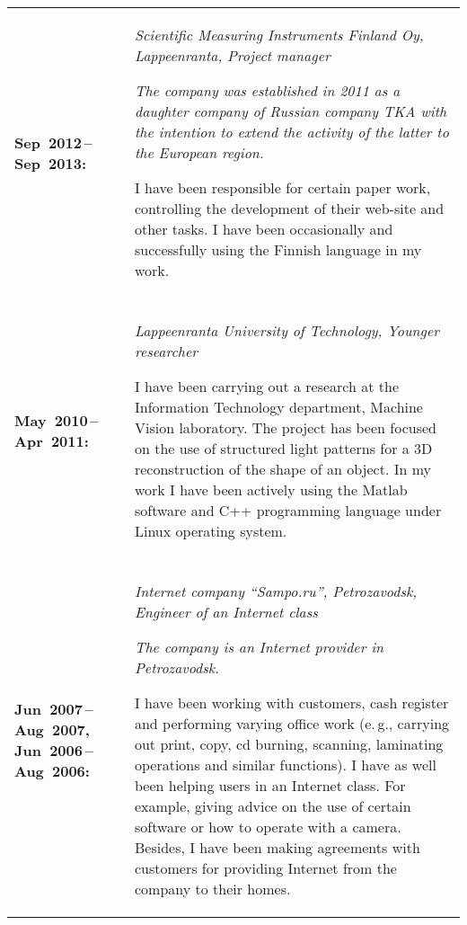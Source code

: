 \documentclass[a4paper]{article}
\begin{document}
\begin{longtable}{p{} p{}}
\textbf{Sep~2012\,--\,Sep~2013:} &
\textmd{\textsl{Scientific Measuring Instruments Finland Oy, Lappeenranta,
  Project manager}}

\textit{The company was established in 2011 as a daughter company of Russian
  company TKA with the intention to extend the activity of the latter to the
  European region.}

  I have been responsible for certain paper work, controlling the development of
  their web-site and other tasks. I have been occasionally and successfully
  using the Finnish language in my work.
\\
&\\

  \textbf{May~2010\,--\,Apr~2011:} &
  \textmd{\textsl{Lappeenranta University of Technology, Younger researcher}}

  I have been carrying out a research at the Information Technology department,
  Machine Vision laboratory. The project has been focused on the use of
  structured light patterns for a 3D reconstruction of the shape of an object.
  In my work I have been actively using the Matlab software and C++ programming
  language under Linux operating system.
\\
&\\

  \textbf{Jun~2007\,--\,Aug~2007, Jun~2006\,--\,Aug~2006:} &
  \textmd{\textsl{Internet company ``Sampo.ru'', Petrozavodsk, Engineer of an
    Internet class}}

  \textit{The company is an Internet provider in Petrozavodsk.}

  I have been working with customers, cash register and performing varying
  office work (e.\,g., carrying out print, copy, cd burning, scanning,
  laminating operations and similar functions). I have as well been helping
  users in an Internet class. For example, giving advice on the use of certain
  software or how to operate with a camera. Besides, I have been making
  agreements with customers for providing Internet from the company to their
  homes.
\end{longtable}
\end{document}
